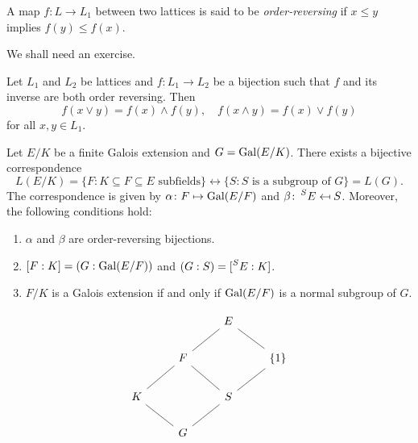 A map $f\colon L\to L_1$ between two lattices is 
said to be \emph{order-reversing} if 
$x\leq y$ implies $f(y)\leq f(x)$. 

We shall need an exercise. 

\begin{exercise}
\label{xca:order_reversing}
    Let $L_1$ and $L_2$ be lattices and $f\colon L_1\to L_2$ be a bijection 
    such that $f$ and its inverse are both order reversing. Then 
    \[
    f(x\vee y)=f(x)\wedge f(y),\quad 
    f(x\wedge y)=f(x)\vee f(y)
    \]
    for all $x,y\in L_1$. 
\end{exercise}



\begin{theorem}[Galois]
    Let $E/K$ be a finite Galois extension and $G=\operatorname{Gal}(E/K)$. 
    There exists a bijective correspondence
    \[
    L(E/K)=\{F:K\subseteq F\subseteq E\text{ subfields}\}\leftrightarrow
    \{S:S\text{ is a subgroup of $G$}\}=L(G). 
    \]
    The correspondence is given by $\alpha\colon F\mapsto \operatorname{Gal}(E/F)$ and 
    $\beta\colon \prescript{S}{}{E}\mapsfrom S$. Moreover, the following
    conditions hold:
    \begin{enumerate}
        \item $\alpha$ and $\beta$ are order-reversing bijections. 
        \item $[F:K]=(G:\operatorname{Gal}(E/F))$ and $(G:S)=[\prescript{S}{}{E}:K]$.
        \item $F/K$ is a Galois extension if and only if $\operatorname{Gal}(E/F)$ is a normal subgroup of $G$.        
    \end{enumerate}
\end{theorem}

\[
\begin{tikzcd}
	&& E \\
	& F && {\{1\}} \\
	K && S \\
	& G
	\arrow[no head, from=1-3, to=2-2]
	\arrow[no head, from=2-2, to=3-1]
	\arrow[no head, from=3-1, to=4-2]
	\arrow[no head, from=4-2, to=3-3]
	\arrow[no head, from=2-2, to=3-3]
	\arrow[no head, from=1-3, to=2-4]
	\arrow[no head, from=2-4, to=3-3]
\end{tikzcd}
\]


